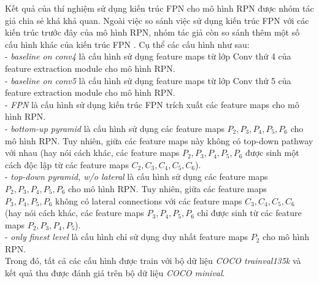 {    \noindent
    Kết quả của thí nghiệm sử dụng kiến trúc FPN  cho mô hình RPN  \cite{ren2015faster} được nhóm tác giả chia sẻ khá khả quan.
    Ngoài việc so sánh việc sử dụng kiến trúc FPN  với các kiến trúc trước đây của mô hình RPN, nhóm tác giả còn so sánh thêm một số cấu hình khác của kiến trúc FPN .
    Cụ thể các cấu hình như sau: \\
    - \textit{baseline on conv4} là cấu hình sử dụng feature maps  từ lớp Conv  thứ 4 của feature extraction module  cho mô hình RPN. \\
    - \textit{baseline on conv5} là cấu hình sử dụng feature maps  từ lớp Conv  thứ 5 của feature extraction module  cho mô hình RPN. \\
    - \textit{FPN} là cấu hình sử dụng kiến trúc FPN trích xuất các feature maps  cho mô hình RPN. \\
    - \textit{bottom-up pyramid} là cấu hình sử dụng các feature maps  \textit{{${P}_{2}, {P}_{3}, {P}_{4}, {P}_{5}, {P}_{6}$}} cho mô hình RPN.
    Tuy nhiên, giữa các feature maps  này không có top-down pathway với nhau (hay nói cách khác, các feature maps  \textit{{${P}_{2}, {P}_{3}, {P}_{4}, {P}_{5}, {P}_{6}$}} được sinh một cách độc lập từ các feature maps  \textit{{${C}_{2}, {C}_{3}, {C}_{4}, {C}_{5}, {C}_{6}$}}). \\
    - \textit{top-down pyramid, w/o lateral} là cấu hình sử dụng các feature maps  \textit{{${P}_{2}, {P}_{3}, {P}_{4}, {P}_{5}, {P}_{6}$}} cho mô hình RPN.
    Tuy nhiên, giữa các feature maps  \textit{{${P}_{3}, {P}_{4}, {P}_{5}, {P}_{6}$}} không có lateral connections  với các feature maps  \textit{{${C}_{3}, {C}_{4}, {C}_{5}, {C}_{6}$}} (hay nói cách khác, các feature maps  \textit{{${P}_{3}, {P}_{4}, {P}_{5}, {P}_{6}$}} chỉ được sinh từ các feature maps  \textit{{${P}_{2}, {P}_{3}, {P}_{4}, {P}_{5}$}}). \\
    - \textit{only finest level} là cấu hình chỉ sử dụng duy nhất feature maps  \textit{${P}_{2}$} cho mô hình RPN. \\
    Trong đó, tất cả các cấu hình được train với bộ dữ liệu \textit{COCO trainval135k} và kết quả thu được đánh giá trên bộ dữ liệu \textit{COCO minival}.
}
